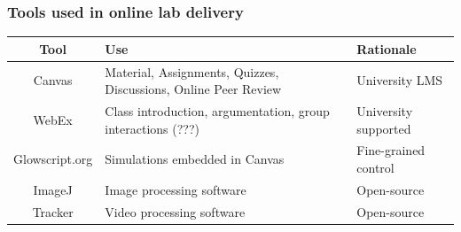 \documentclass[aspectratio=169,shadow=true]{beamer}
\begin{document}
{\nologo
  \begin{frame}
    \frametitle{Tools used in online lab delivery}
    \begin{center}
      \renewcommand{\arraystretch}{1.5}
      \begin{tabular}{cll}
        \hline\hline
        \textbf{Tool} & \textbf{Use} & \textbf{Rationale} \\
        \hline
        Canvas & \parbox[t]{2in}{\raggedright Material, Assignments, Quizzes, Discussions,
                 Online Peer Review }& University LMS\\
        WebEx & \parbox[t]{2in}{\raggedright Class introduction, argumentation, group interactions (???)} & University supported\\
        Glowscript.org & \parbox[t]{2in}{\raggedright Simulations embedded in Canvas} &
                                                                                    Fine-grained
                                                                                    control\\
        ImageJ &Image processing software &Open-source \\
        Tracker &Video processing software &Open-source \\
        \hline\hline
      \end{tabular}
    \end{center}
  \end{frame}
}
\end{document}
